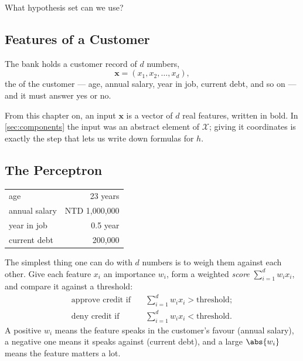 \begin{question}
    What hypothesis set can we use?
\end{question}

\subsection{Features of a Customer}

The bank
holds a customer record of \(d\) numbers,
\[
    \bm{x} = (x_1, x_2, \dots , x_d),
\]
the  of the customer --- age, annual salary, year in job,
current debt, and so on --- and it must answer yes or no.

\begin{notation}
    From this chapter on, an input \(\bm{x}\) is a vector of \(d\) real
    features, written in bold. In \autoref{sec:components} the input was an
    abstract element of \(\mathcal{X}\); giving it coordinates is exactly the
    step that lets us write down formulas for \(h\).
\end{notation}

\subsection{The Perceptron}

\begin{center}
    \begin{tabular}{@{}lr@{}}
        \toprule
        age           & 23 years\\
        annual salary & NTD 1,000,000\\
        year in job   & 0.5 year\\
        current debt  & 200,000\\
        \bottomrule
    \end{tabular}
\end{center}

The simplest thing one can do with \(d\) numbers is to weigh them against each
other. Give each feature \(x_i\) an importance \(w_i\), form a weighted
\emph{score} \(\sum_{i=1}^d w_i x_i\), and compare it against a threshold:
\begin{align*}
    \text{approve credit if} \quad & \sum_{i=1}^d w_i x_i > \text{threshold};\\
    \text{deny credit if} \quad & \sum_{i=1}^d w_i x_i < \text{threshold}.
\end{align*}
A positive \(w_i\) means the feature speaks in the customer's favour (annual
salary), a negative one means it speaks against (current debt), and a large
\(\abs{w_i}\) means the feature matters a lot.

